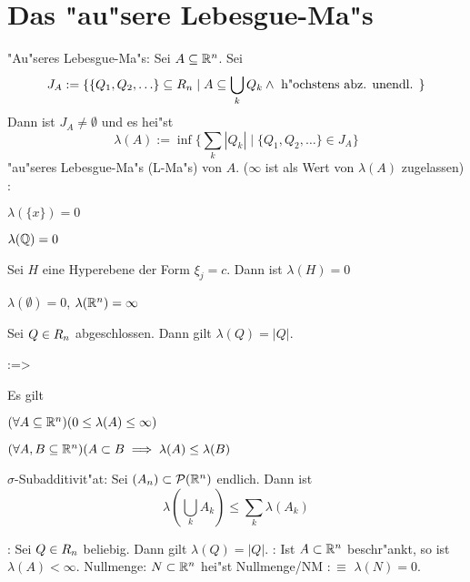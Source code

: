 \section{Das "au"sere Lebesgue-Ma"s}
 "Au"seres Lebesgue-Ma"s:{
  Sei $A\subseteq\mathbb R^n$. Sei 
  \[J_A:=\{
      \{Q_1,Q_2,\ldots\}\subseteq R_{n} \mid 
      A\subseteq\bigcup_k Q_k \land \text{ h"ochstens abz. unendl. }
      \}
    \]
  Dann ist $J_A\neq\emptyset$ und es hei"st
  \[\lambda(A):=\inf\{\sum_k |Q_k| \mid \{Q_1,Q_2,\ldots\}\in J_A\}
    \]
  "au"seres Lebesgue-Ma"s (L-Ma"s) von $A$. 
  ($\infty$ ist als Wert von $\lambda(A)$ zugelassen)
  }
\example:{
  \begin{stmts}
    \item $\lambda(\{x\})=0$
    \item $\lambda(\mathbb Q)=0$
    \item Sei $H$ eine Hyperebene der Form $\xi_j=c$. Dann ist $\lambda(H)=0$
    \item $\lambda(\emptyset)=0$, $\lambda(\mathbb R^n)=\infty$
    \item Sei $Q\in R_{n}$ abgeschlossen. Dann gilt $\lambda(Q)=|Q|$.
    \end{stmts}
  }
\theorem:=>{
  Es gilt
  \begin{stmts} 
    \item $(\forall A\subseteq\mathbb R^n)(0\leq\lambda(A)\leq\infty)$
    \item $(\forall A,B\subseteq\mathbb R^n)
      (A\subset B\implies \lambda(A)\leq\lambda(B)$
    \item $\sigma$-Subadditivit"at: Sei $(A_n)\subset\mathcal{P}(\mathbb R^n)$ 
      endlich. Dann ist
      \[\lambda(\bigcup_k A_k)\leq\sum_k\lambda(A_k)
        \]
    \end{stmts}
  \label{the:lebesgue-prop}
  }
\example:{
  Sei $Q\in R_{n}$ beliebig. Dann gilt $\lambda(Q)=|Q|$.
  }
\remark:{
  Ist $A\subset\mathbb R^n$ beschr"ankt, so ist $\lambda(A)<\infty$.
  }
 Nullmenge:{
  $N\subset\mathbb R^n$ hei"st Nullmenge/NM $:\equiv$ $\lambda(N)=0$.
  }
